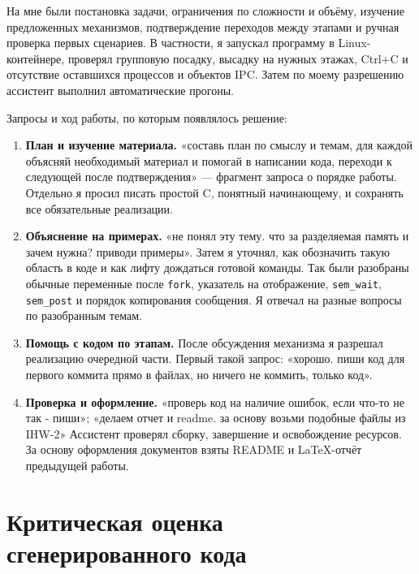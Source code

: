 \documentclass[12pt,a4paper]{article}
\begin{document}
На мне были постановка задачи, ограничения по сложности и объёму,
изучение предложенных механизмов, подтверждение переходов между этапами
и ручная проверка первых сценариев. В частности, я запускал программу
в Linux-контейнере, проверял групповую посадку, высадку на нужных этажах,
Ctrl+C и отсутствие оставшихся процессов и объектов IPC. Затем
по моему разрешению ассистент выполнил автоматические прогоны.

Запросы и ход работы, по которым появлялось решение:
\begin{enumerate}
\setlength{\itemsep}{0pt}
\setlength{\parsep}{0pt}
\setlength{\parskip}{0pt}
\item \textbf{План и изучение материала.} «составь план по смыслу и темам, для каждой объясняй необходимый материал и помогай в
написании кода, переходи к следующей после подтверждения» --- фрагмент
запроса о порядке работы. Отдельно я просил писать простой C,
понятный начинающему, и сохранять все обязательные реализации.

\item \textbf{Объяснение на примерах.} «не понял эту тему. что за
разделяемая память и зачем нужна? приводи примеры». Затем я уточнял, как обозначить такую
область в коде и как лифту дождаться готовой команды. Так были разобраны
обычные переменные после \verb|fork|, указатель на отображение,
\verb|sem_wait|, \verb|sem_post| и порядок копирования сообщения.
Я отвечал на разные вопросы по разобранным темам.

\item \textbf{Помощь с кодом по этапам.} После обсуждения механизма
я разрешал реализацию очередной части. Первый такой запрос:
«хорошо. пиши код для первого коммита прямо в файлах, но ничего не
коммить, только код».

\item \textbf{Проверка и оформление.} «проверь код на наличие ошибок, если что-то не так - пиши»; «делаем отчет и readme. за основу возьми
подобные файлы из IHW-2» Ассистент проверял сборку,
завершение и освобождение ресурсов. За основу оформления документов
взяты README и LaTeX-отчёт предыдущей работы.
\end{enumerate}

\section{Критическая оценка сгенерированного кода}
\end{document}

